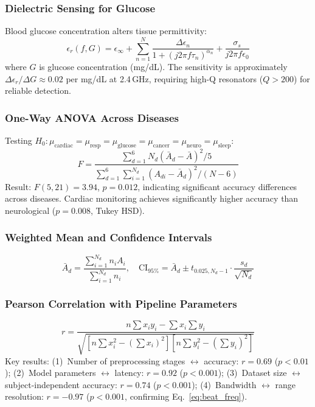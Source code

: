 \documentclass[journal,twoside]{IEEEtran}
\begin{document}
\subsubsection{Dielectric Sensing for Glucose}
Blood glucose concentration alters tissue permittivity:
\begin{equation}
\epsilon_r(f, G) = \epsilon_\infty + \sum_{n=1}^{N} \frac{\Delta\epsilon_n}{1 + (j2\pi f \tau_n)^{\alpha_n}} + \frac{\sigma_s}{j2\pi f \epsilon_0}
\label{eq:debye}
\end{equation}
where $G$ is glucose concentration (mg/dL). The sensitivity is approximately $\Delta\epsilon_r / \Delta G \approx 0.02$ per mg/dL at 2.4\,GHz, requiring high-Q resonators ($Q > 200$) for reliable detection.

\subsubsection{One-Way ANOVA Across Diseases}
Testing $H_0: \mu_{\text{cardiac}} = \mu_{\text{resp}} = \mu_{\text{glucose}} = \mu_{\text{cancer}} = \mu_{\text{neuro}} = \mu_{\text{sleep}}$:
\begin{equation}
F = \frac{\sum_{d=1}^{6} N_d(\bar{A}_d - \bar{A})^2 / 5}{\sum_{d=1}^{6}\sum_{i=1}^{N_d}(A_{di} - \bar{A}_d)^2 / (N-6)}
\label{eq:anova_c}
\end{equation}
Result: $F(5, 21) = 3.94$, $p = 0.012$, indicating significant accuracy differences across diseases. Cardiac monitoring achieves significantly higher accuracy than neurological ($p = 0.008$, Tukey HSD).

\subsubsection{Weighted Mean and Confidence Intervals}
\begin{equation}
\bar{A}_d = \frac{\sum_{i=1}^{N_d} n_i A_i}{\sum_{i=1}^{N_d} n_i}, \quad \text{CI}_{95\%} = \bar{A}_d \pm t_{0.025, N_d-1} \cdot \frac{s_d}{\sqrt{N_d}}
\label{eq:ci_c}
\end{equation}

\subsubsection{Pearson Correlation with Pipeline Parameters}
\begin{equation}
r = \frac{n\sum x_i y_i - \sum x_i \sum y_i}{\sqrt{[n\sum x_i^2 - (\sum x_i)^2][n\sum y_i^2 - (\sum y_i)^2]}}
\end{equation}
Key results: (1)~Number of preprocessing stages $\leftrightarrow$ accuracy: $r = 0.69$ ($p < 0.01$); (2)~Model parameters $\leftrightarrow$ latency: $r = 0.92$ ($p < 0.001$); (3)~Dataset size $\leftrightarrow$ subject-independent accuracy: $r = 0.74$ ($p < 0.001$); (4)~Bandwidth $\leftrightarrow$ range resolution: $r = -0.97$ ($p < 0.001$, confirming Eq.~\ref{eq:beat_freq}).
\end{document}
